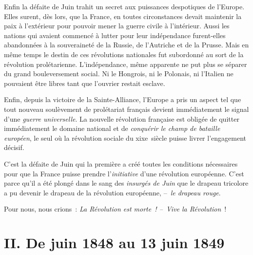 \documentclass[french,twoside]{book} %
\newcommand\chapteropen{} %
\newcommand\chapterclose{} %
\begin{document}
Enfin la défaite de Juin trahit un secret aux puissances despotiques de l’Europe. Elles surent, dès lors, que la France, en toutes circonstances devait maintenir la paix à l’extérieur pour pouvoir mener la guerre civile à l’intérieur. Aussi les nations qui avaient commencé à lutter pour leur indépendance furent-elles abandonnées à la souveraineté de la Russie, de l’Autriche et de la Prusse. Mais en même temps le destin de ces révolutions nationales fut subordonné au sort de la révolution prolétarienne. L’indépendance, même apparente ne put plus se séparer du grand bouleversement social. Ni le Hongrois, ni le Polonais, ni l’Italien ne pouvaient être libres tant que l’ouvrier restait esclave.\par
Enfin, depuis la victoire de la Sainte-Alliance, l’Europe a pris un aspect tel que tout nouveau soulèvement de prolétariat français devient immédiatement le signal d’une \emph{guerre universelle}. La nouvelle révolution française est obligée de quitter immédiatement le domaine national et de \emph{conquérir le champ de bataille européen}, le seul où la révolution sociale du xixe siècle puisse livrer l’engagement décisif.\par
C’est la défaite de Juin qui la première a créé toutes les conditions nécessaires pour que la France puisse prendre l’\emph{initiative} d’une révolution européenne. C’est parce qu’il a été plongé dans le sang des \emph{insurgés de Juin} que le drapeau tricolore a pu devenir le drapeau de la révolution européenne, – \emph{le drapeau rouge}.\par
Pour nous, nous crions : \emph{La Révolution est morte ! – Vive la Révolution} !
\chapterclose


\chapteropen

\chapter[{II. De juin 1848 au 13 juin 1849}]{II. De juin 1848 au 13 juin 1849}
\renewcommand{\leftmark}{II. De juin 1848 au 13 juin 1849}
\end{document}
